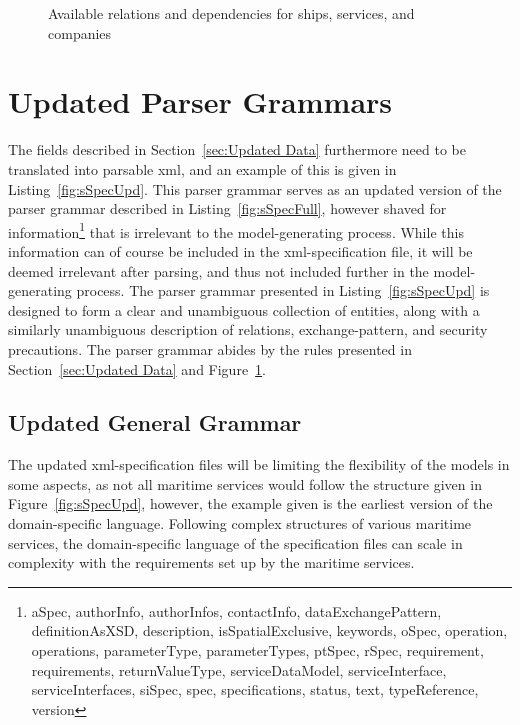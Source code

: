 \begin{figure}
  \caption{Available relations and dependencies for ships, services, and companies}
  \label{fig:entities}
\end{figure}


\section{Updated Parser Grammars}

The fields described in Section~\ref{sec:Updated Data} furthermore need to be translated into parsable xml, and an example of this is given in Listing~\ref{fig:sSpecUpd}. This parser grammar serves as an updated version of the parser grammar described in Listing~\ref{fig:sSpecFull}, however shaved for information\footnote{aSpec, authorInfo, authorInfos, contactInfo, dataExchangePattern, definitionAsXSD, description, isSpatialExclusive, keywords, oSpec, operation, operations, parameterType, parameterTypes, ptSpec, rSpec, requirement, requirements, returnValueType, serviceDataModel, serviceInterface, serviceInterfaces, siSpec, spec, specifications, status, text, typeReference, version} that is irrelevant to the model-generating process. While this information can of course be included in the xml-specification file, it will be deemed irrelevant after parsing, and thus not included further in the model-generating process. The parser grammar presented in Listing~\ref{fig:sSpecUpd} is designed to form a clear and unambiguous collection of entities, along with a similarly unambiguous description of relations, exchange-pattern, and security precautions. The parser grammar abides by the rules presented in Section~\ref{sec:Updated Data} and Figure~\ref{fig:entities}.

\subsection{Updated General Grammar}
The updated xml-specification files will be limiting the flexibility of the models in some aspects, as not all maritime services would follow the structure given in Figure~\ref{fig:sSpecUpd}, however, the example given is the earliest version of the domain-specific language. Following complex structures of various maritime services, the domain-specific language of the specification files can scale in complexity with the requirements set up by the maritime services.

